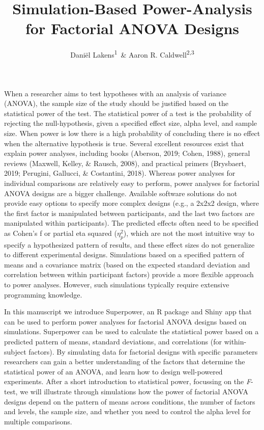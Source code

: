 \documentclass[
  ,jou,floatsintext]{apa6}
\affiliation{
\vspace{0.5cm}
\textsuperscript{1} Human-Technology Interaction Group, Eindhoven University of Technology, The Netherlands\\\textsuperscript{2} Department of Health, Human Performance and Recreation, University of Arkansas, USA\\\textsuperscript{3} Thermal and Mountain Medicine Division, U.S. Army Research Institute of Environmental Medicine, USA}
\title{Simulation-Based Power-Analysis for Factorial ANOVA Designs}
\author{Daniël Lakens\textsuperscript{1}~\& Aaron R. Caldwell\textsuperscript{2,3}}
\date{}
\begin{document}
\maketitle

When a researcher aims to test hypotheses with an analysis of variance (ANOVA), the sample size of the study should be justified based on the statistical power of the test.
The statistical power of a test is the probability of rejecting the null-hypothesis, given a specified effect size, alpha level, and sample size.
When power is low there is a high probability of concluding there is no effect when the alternative hypothesis is true.
Several excellent resources exist that explain power analyses, including books (Aberson, 2019; Cohen, 1988), general reviews (Maxwell, Kelley, \& Rausch, 2008), and practical primers (Brysbaert, 2019; Perugini, Gallucci, \& Costantini, 2018).
Whereas power analyses for individual comparisons are relatively easy to perform, power analyses for factorial ANOVA designs are a bigger challenge.
Available software solutions do not provide easy options to specify more complex designs (e.g., a 2x2x2 design, where the first factor is manipulated between participants, and the last two factors are manipulated within participants).
The predicted effects often need to be specified as Cohen's f or partial eta squared (\(\eta_p^2\)), which are not the most intuitive way to specify a hypothesized pattern of results, and these effect sizes do not generalize to different experimental designs.
Simulations based on a specified pattern of means and a covariance matrix (based on the expected standard deviation and correlation between within participant factors) provide a more flexible approach to power analyses.
However, such simulations typically require extensive programming knowledge.

In this manuscript we introduce Superpower, an R package and Shiny app that can be used to perform power analyses for factorial ANOVA designs based on simulations.
Superpower can be used to calculate the statistical power based on a predicted pattern of means, standard deviations, and correlations (for within-subject factors).
By simulating data for factorial designs with specific parameters researchers can gain a better understanding of the factors that determine the statistical power of an ANOVA, and learn how to design well-powered experiments.
After a short introduction to statistical power, focussing on the \emph{F}-test, we will illustrate through simulations how the power of factorial ANOVA designs depend on the pattern of means across conditions, the number of factors and levels, the sample size, and whether you need to control the alpha level for multiple comparisons.
\end{document}
